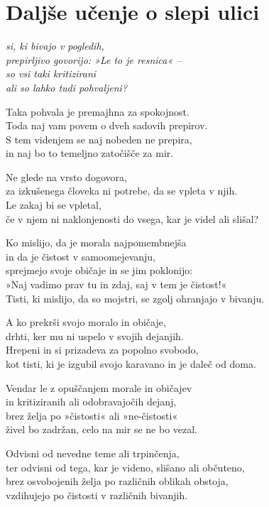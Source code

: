 \cleartorecto
{}
\chapter{Daljše učenje o slepi ulici}

\emph{si, ki bivajo v pogledih,\\
prepirljivo govorijo: »Le to je resnica« --\\
so vsi taki kritizirani\\
ali so lahko tudi pohvaljeni?}

Taka pohvala je premajhna za spokojnost.\\
Toda naj vam povem o dveh sadovih prepirov.\\
S tem videnjem se naj nobeden ne prepira,\\
in naj bo to temeljno zatočišče za mir.

\clearpage

Ne glede na vrsto dogovora,\\
za izkušenega človeka ni potrebe, da se vpleta v njih.\\
Le zakaj bi se vpletal,\\
če v njem ni naklonjenosti do vsega, kar je videl ali slišal?

Ko mislijo, da je morala najpomembnejša\\\vin in da je čistost v samoomejevanju,\\
sprejmejo svoje običaje in se jim poklonijo:\\
»Naj vadimo prav tu in zdaj, saj v tem je čistost!«\\
Tisti, ki mislijo, da so mojstri, se zgolj ohranjajo v bivanju.

A ko prekrši svojo moralo in običaje,\\
drhti, ker mu ni uspelo v svojih dejanjih.\\
Hrepeni in si prizadeva za popolno svobodo,\\
kot tisti, ki je izgubil svojo karavano in je daleč od doma.

Vendar le z opuščanjem morale in običajev\\
in kritiziranih ali odobravajočih dejanj,\\
brez želja po »čistosti« ali »ne-čistosti«\\
živel bo zadržan, celo na mir se ne bo vezal.

Odvisni od nevedne teme ali trpinčenja,\\
ter odvisni od tega, kar je videno, slišano ali občuteno,\\
brez osvobojenih želja po različnih oblikah obstoja,\\
vzdihujejo po čistosti v različnih bivanjih.

